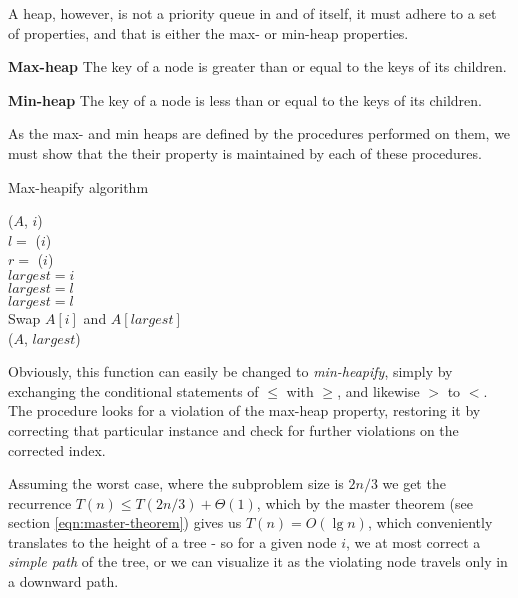 A heap, however, is not a priority queue in and of itself, it must adhere to
a set of properties, and that is either the max- or min-heap properties.
\begin{description}
	\item \textbf{Max-heap} The key of a node is greater than or equal to the
keys of its children.
	\item \textbf{Min-heap} The key of a node is less than or equal to the
keys of its children.
\end{description}
As the max- and min heaps are defined by the procedures performed on them, we
must show that the their property is maintained by each of these procedures.

\begin{algorithm}[H]
	\caption{Max-heapify algorithm}
	\label{alg:max-heapify}
	
	
	
	
	\BlankLine
	\MaxHeapify($A$, $i$) \\
	\Begin
	{
		$l = $ \Left($i$) \\
		$r = $ \Right($i$) \\
		$largest = i$ \\
		{
			$largest = l$ \\
		}
		{
			$largest = l$ \\
		}
		{
			Swap $A[i]$ and $A[largest]$ \\
			\MaxHeapify($A$, $largest$)
		}
	}
\end{algorithm}
Obviously, this function can easily be changed to \textit{min-heapify}, simply
by exchanging the conditional statements of $\leq$ with $\geq$, and likewise
$>$ to $<$. The procedure looks for a violation of the max-heap property,
restoring it by correcting that particular instance and check for further
violations on the corrected index.

Assuming the worst case, where the subproblem size is $2n/3$ we get the
recurrence $T(n) \leq T(2n/3) + \Theta(1)$, which by the master theorem (see
section \ref{eqn:master-theorem}) gives us $T(n) = O(\lg n)$, which
conveniently translates to the height of a tree - so for a given node $i$, we
at most correct a \textit{simple path} of the tree, or we can visualize it as
the violating node travels only in a downward path.

